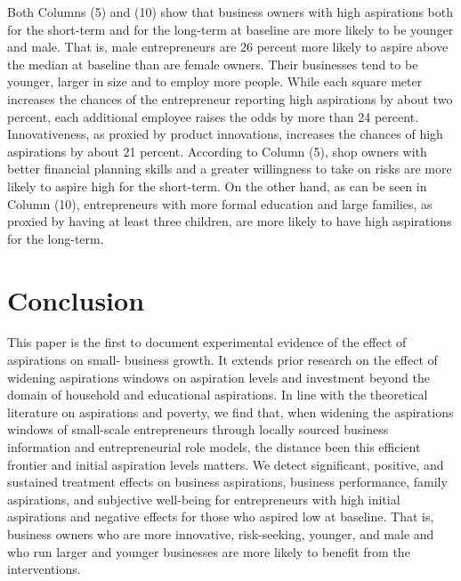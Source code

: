 \documentclass[11.5pt]{article}
\begin{document}
Both Columns (5) and (10) show that business owners with high aspirations both for the short-term and for the long-term at baseline are more likely to be younger and male. That is, male entrepreneurs are 26 percent more likely to aspire above the median at baseline than are female owners. Their businesses tend to be younger, larger in size and to employ more people. While each square meter increases the chances of the entrepreneur reporting high aspirations by about two percent, each additional employee raises the odds by more than 24 percent. Innovativeness, as proxied by product innovations, increases the chances of high aspirations by about 21 percent. According to Column (5), shop owners with better financial planning skills and a greater willingness to take on risks are more likely to aspire high for the short-term. On the other hand, as can be seen in Column (10), entrepreneurs with more formal education and large families, as proxied by having at least three children, are more likely to have high aspirations for the long-term.



\section{Conclusion}\label{sec.conc}

This paper is the first to document experimental evidence of the effect of aspirations on small-
business growth. It extends prior research on the effect of widening aspirations windows on aspiration levels and investment beyond the domain of household and educational aspirations. In line with the theoretical literature on aspirations and poverty, we find that, when widening the aspirations windows of small-scale entrepreneurs through locally sourced business information and entrepreneurial role models, the distance been this efficient frontier and initial aspiration levels matters. We detect significant, positive, and sustained treatment effects on business aspirations, business performance, family aspirations, and subjective well-being for entrepreneurs with high initial aspirations and negative effects for those who aspired low at baseline. That is, business owners who are more innovative, risk-seeking, younger, and male and who run larger and younger businesses are more likely to benefit from the interventions.
\end{document}
